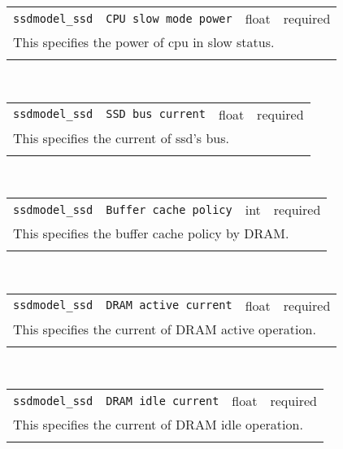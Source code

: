 \noindent 
\begin{tabular}{|p{\lpmodwidth}|p{\lpnamewidth}|p{0.5in}|p{0.5in}|}
\cline{1-4}
\texttt{ssdmodel\_ssd} & \texttt{CPU slow mode power} & float & required \\ 
\cline{1-4}
\multicolumn{4}{|p{6in}|}{
This specifies the power of cpu in slow status.
}\\ 
\cline{1-4}
\multicolumn{4}{p{5in}}{}\\
\end{tabular}\\ 
\noindent 
\begin{tabular}{|p{\lpmodwidth}|p{\lpnamewidth}|p{0.5in}|p{0.5in}|}
\cline{1-4}
\texttt{ssdmodel\_ssd} & \texttt{SSD bus current} & float & required \\ 
\cline{1-4}
\multicolumn{4}{|p{6in}|}{
This specifies the current of ssd's bus.
}\\ 
\cline{1-4}
\multicolumn{4}{p{5in}}{}\\
\end{tabular}\\ 
\noindent 
\begin{tabular}{|p{\lpmodwidth}|p{\lpnamewidth}|p{0.5in}|p{0.5in}|}
\cline{1-4}
\texttt{ssdmodel\_ssd} & \texttt{Buffer cache policy} & int & required \\ 
\cline{1-4}
\multicolumn{4}{|p{6in}|}{
This specifies the buffer cache policy by DRAM.
}\\ 
\cline{1-4}
\multicolumn{4}{p{5in}}{}\\
\end{tabular}\\ 
\noindent 
\begin{tabular}{|p{\lpmodwidth}|p{\lpnamewidth}|p{0.5in}|p{0.5in}|}
\cline{1-4}
\texttt{ssdmodel\_ssd} & \texttt{DRAM active current} & float & required \\ 
\cline{1-4}
\multicolumn{4}{|p{6in}|}{
This specifies the current of DRAM active operation.
}\\ 
\cline{1-4}
\multicolumn{4}{p{5in}}{}\\
\end{tabular}\\ 
\noindent 
\begin{tabular}{|p{\lpmodwidth}|p{\lpnamewidth}|p{0.5in}|p{0.5in}|}
\cline{1-4}
\texttt{ssdmodel\_ssd} & \texttt{DRAM idle current} & float & required \\ 
\cline{1-4}
\multicolumn{4}{|p{6in}|}{
This specifies the current of DRAM idle operation.
}\\ 
\cline{1-4}
\multicolumn{4}{p{5in}}{}\\
\end{tabular}\\ 
